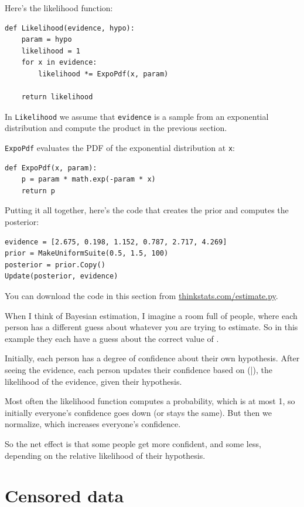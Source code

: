 \documentclass[12pt]{book}
\begin{document}
Here's the likelihood function:
%
\begin{verbatim}
def Likelihood(evidence, hypo):
    param = hypo
    likelihood = 1
    for x in evidence:
        likelihood *= ExpoPdf(x, param)

    return likelihood
\end{verbatim}

In {\tt Likelihood} we assume that {\tt evidence} is a sample
from an exponential distribution and compute the product in the
previous section.

{\tt ExpoPdf} evaluates the PDF of the exponential distribution
at {\tt x}:
%
\begin{verbatim}
def ExpoPdf(x, param):
    p = param * math.exp(-param * x)
    return p
\end{verbatim}

Putting it all together, here's the code that creates the prior
and computes the posterior:
%
\begin{verbatim}
evidence = [2.675, 0.198, 1.152, 0.787, 2.717, 4.269]
prior = MakeUniformSuite(0.5, 1.5, 100)
posterior = prior.Copy()
Update(posterior, evidence)
\end{verbatim}

You can download the code in this section from
\url{thinkstats.com/estimate.py}.

When I think of Bayesian estimation, I imagine a room full of people,
where each person has a different guess about whatever you are trying
to estimate.  So in this example they each have a guess about the
correct value of \mylambda.

Initially, each person has a degree of confidence about their own hypothesis.
After seeing the evidence, each person updates their confidence based on
\Prob(\E|\HH), the likelihood of the evidence, given their hypothesis.

Most often the likelihood function computes a
probability, which is at most 1, so initially everyone's confidence
goes down (or stays the same).  But then we normalize, which increases
everyone's confidence.

So the net effect is that some people get more confident, and some less,
depending on the relative likelihood of their hypothesis.


\section{Censored data}
\label{censored}
\end{document}

